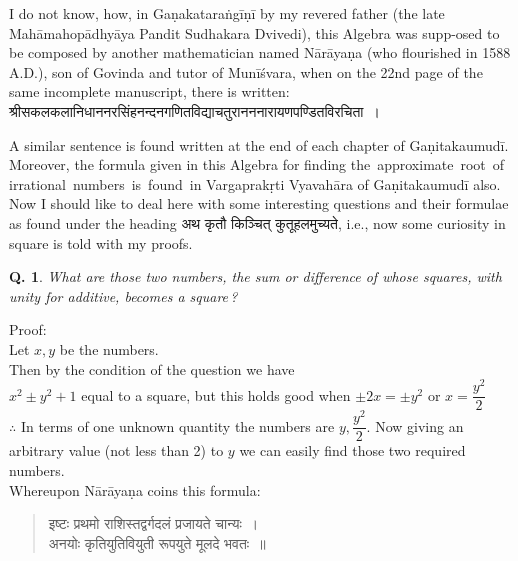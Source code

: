 \documentclass[11pt, openany]{book}
\newtheorem{question}{Q.}
\begin{document}
 \vspace{-2mm}
 I do not know, how, in Gaṇakataraṅgīṇī by my revered 
father (the late Mahāmahopādhyāya Pandit Sudhakara Dvivedi), 
this Algebra was supp-osed to be composed by another 
mathematician named Nārāyaṇa (who flourished in 1588 A.D.), 
son of Govinda and tutor of Munīśvara, when on the 22nd 
page of the same incomplete manuscript, there is written: 
{\qt श्रीसकलकलानिधाननरसिंहनन्दनगणितविद्याचतुरानननारायणपण्डितविरचिता~।} 

\newpage%
 
 A similar sentence is found written at the end of each 
chapter of Gaṇitakaumudī. Moreover, the formula given in 
this Algebra for finding the\, approximate \,root \,of \,irrational \,numbers \,is \,found \,in Vargaprakṛti Vyavahāra of Gaṇitakaumudī also. \\

\vspace{-2mm}
 Now I should like to deal here with some interesting 
questions and their formulae as found under the heading 
अथ कृतौ किञ्चित् कुतूहलमुच्यते, i.e., now some curiosity in square is
told with my proofs. 

\begin{question}
  What are those two numbers, the sum or difference of whose squares, with unity for additive, becomes a 
square\,? 
\end{question}
\noindent Proof:\textemdash\\

\vspace{-2mm}
Let $x, y$ be the numbers. \\

\vspace{-2mm}
\noindent Then by the condition of the question we have \\

\vspace{-2mm}
 $x^{2} \pm y^{2}+1$ equal to a square, but this holds good 
when $\pm 2x = \pm y^{2}$ or $x = \dfrac{y^{2}}{2}$\\

\vspace{-2mm}
 $\therefore$\; In terms of one unknown quantity the numbers 
are $y, \dfrac{y^{2}}{2}$. Now giving an arbitrary value (not less than 2)
to $y$ we can easily find those two required numbers.\\

\vspace{-2mm}
Whereupon Nārāyaṇa coins this formula: 
\begin{quote}
    \qt 
     इष्टः प्रथमो राशिस्तद्वर्गदलं प्रजायते चान्यः~। \\
 अनयोः कृतियुतिवियुती रूपयुते मूलदे भवतः~॥~
\end{quote}
\end{document}
